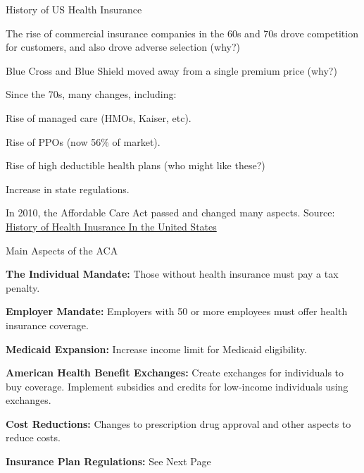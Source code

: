 \documentclass[aspectratio=169]{beamer}
\newenvironment{wideitemize}{\itemize\addtolength{\itemsep}{10pt}}{\enditemize}
\begin{document}
\begin{frame}{History of US Health Insurance}
    \begin{wideitemize}
        \item The rise of commercial insurance companies in the 60s and 70s drove competition for customers, and also drove adverse selection (why?)
        \item Blue Cross and Blue Shield moved away from a single premium price (why?)
        \item Since the 70s, many changes, including:
        \begin{wideitemize}
            \item Rise of managed care (HMOs, Kaiser, etc).
            \item Rise of PPOs (now 56\% of market).
            \item Rise of high deductible health plans (who might like these?)
            \item Increase in state regulations.
        \end{wideitemize}
        \item In 2010, the Affordable Care Act passed and changed many aspects.
    \end{wideitemize}
    Source: \hyperlink{https://account.ache.org/iweb/upload/Morrisey2253_Chapter_1-3b5f4e08.pdf}{History of Health Inusrance In the United States}
\end{frame}



\begin{frame}{Main Aspects of the ACA}
    \begin{wideitemize}
        \item \textbf{The Individual Mandate:} Those without health insurance must pay a tax penalty.
        \item \textbf{Employer Mandate:} Employers with 50 or more employees must offer health insurance coverage.
        \item \textbf{Medicaid Expansion:} Increase income limit for Medicaid eligibility.
        \item \textbf{American Health Benefit Exchanges:} Create exchanges for individuals to buy coverage. Implement subsidies and credits for low-income individuals using exchanges.
        \item \textbf{Cost Reductions:} Changes to prescription drug approval and other aspects to reduce costs.
        \item \textbf{Insurance Plan Regulations:} See Next Page
    \end{wideitemize}
\end{frame}
\end{document}
